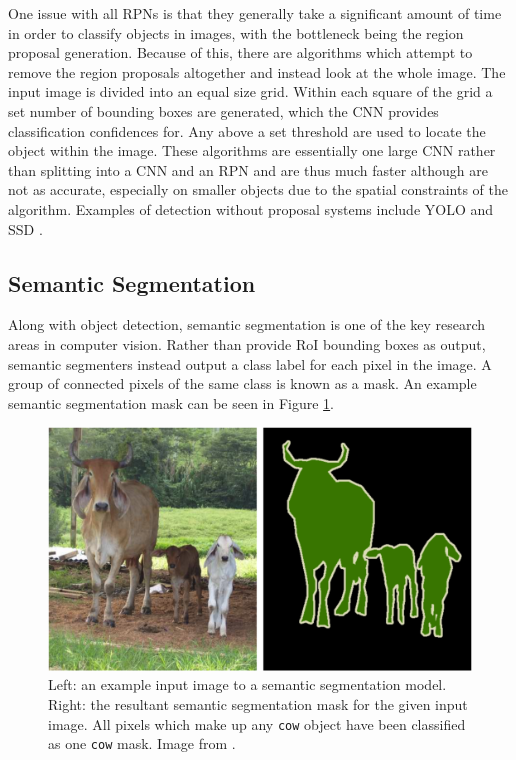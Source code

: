One issue with all RPNs is that they generally take a significant amount of time in order to classify objects in images, with the bottleneck being the region proposal generation. Because of this, there are algorithms which attempt to remove the region proposals altogether and instead look at the whole image. The input image is divided into an equal size grid. Within each square of the grid a set number of bounding boxes are generated, which the CNN provides classification confidences for. Any above a set threshold are used to locate the object within the image. These algorithms are essentially one large CNN rather than splitting into a CNN and an RPN and are thus much faster although are not as accurate, especially on smaller objects due to the spatial constraints of the algorithm. Examples of detection without proposal systems include YOLO \cite{redmon_you_2016} and SSD \cite{liu_ssd:_2016}. 

\subsection{Semantic Segmentation}\label{ch:Background,sec:semanticSegmentation}

Along with object detection, semantic segmentation is one of the key research areas in computer vision. Rather than provide RoI bounding boxes as output, semantic segmenters instead output a class label for each pixel in the image. A group of connected pixels of the same class is known as a mask. An example semantic segmentation mask can be seen in Figure \ref{fig:semantic-eg}.


\begin{figure}
	\begin{center}
		\includegraphics[scale=0.15]{Chapter2/figs/semantic_segmentation_updated.png}
	\end{center}
	\caption[Left: an example input image to a semantic segmentation model. Right: the resultant semantic segmentation mask for the given input image.]{Left: an example input image to a semantic segmentation model. Right: the resultant semantic segmentation mask for the given input image. All pixels which make up any \texttt{cow} object have been classified as one \texttt{cow} mask. Image from \cite{noh_learning_2015}.}
	\label{fig:semantic-eg}
\end{figure}

